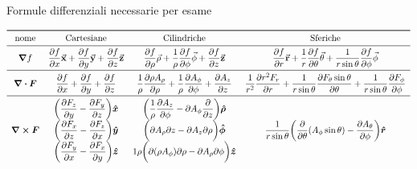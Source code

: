 \documentclass[a4paper]{scrarticle}
\begin{document}
\begin{sidewaystable}
\caption{Formule differenziali necessarie per esame}
    \[
\begin{array}{cccc}
    \toprule
    \text{nome} & \text{Cartesiane} & \text{Cilindriche} & \text{Sferiche}\\
\midrule
\displaystyle \grad{f} & 
    \displaystyle \pdv{f}{x} \va x + \pdv{f}{y} \va y + \pdv{f}{z} \va z &
    \displaystyle \pdv{f}{\rho}\va \rho + \frac{1}{\rho}\pdv{f}{\phi}\va \phi + \pdv{f}{z} \va z &
    \displaystyle \pdv{f}{r} \va r + \frac{1}{r} \pdv{f}{\theta} \va \theta + \frac{1}{r\sin{\theta}} \pdv{f}{\phi} \va \phi\\ 
\midrule
\displaystyle \div{\bm{F}} &
    \displaystyle \pdv{f}{x} + \pdv{f}{y} + \pdv{f}{z} &
    \displaystyle \frac{1}{\rho} \pdv{ \rho A_\rho } { \rho}
    + \frac{1} {\rho}\pdv {A_\phi} {\phi}
    + \pdv{ A_z} {z}&
    \displaystyle \frac{1}{r^2} \pdv{r^2 F_r}{r} + \frac{1}{r \sin \theta} \pdv{F_{\theta} \sin \theta}{\theta} + \frac{1}{ r \sin \theta}\pdv{F_{\phi}}{\phi}\\ 
\midrule
\displaystyle \curl{\bm{F}} & 
\begin{matrix}
    \displaystyle \bigg(\pdv{F_z}{y} - \pdv{F_y}{z} \bigg) \boldsymbol{\hat x}\\
    \displaystyle \bigg(\pdv{F_x}{z} - \pdv{F_z}{x}\bigg) \boldsymbol{\hat y}\\
    \displaystyle \bigg(\pdv{F_y}{x} - \pdv{F_x}{y}\bigg) \boldsymbol{\hat z}
\end{matrix} & 
\begin{matrix}
    \displaystyle \bigg (\frac{1 }{ \rho}\pdv{ A_z }{ \phi}
    - {\partial A_\phi } \pdv{  z} \bigg ) \boldsymbol{\hat \rho}  \\
    \displaystyle \bigg ({\partial A_\rho }{ \partial z} - {\partial A_z }{ \partial \rho} \bigg) \boldsymbol{\hat \phi} \\
    \displaystyle{1 }{ \rho}\bigg ({\partial ( \rho A_\phi ) }{ \partial \rho}
    - {\partial A_\rho }{ \partial \phi} \bigg ) \boldsymbol{\hat z}
\end{matrix} &
\begin{matrix}
    \displaystyle \frac{1 }{ r\sin\theta} \bigg (\frac{\partial }{ \partial \theta} ( A_\phi\sin\theta )
    - \frac{\partial A_\theta }{ \partial \phi} \bigg ) \boldsymbol{\hat r} \\

\end{matrix}
\end{array}\]
\end{sidewaystable}
\end{document}
